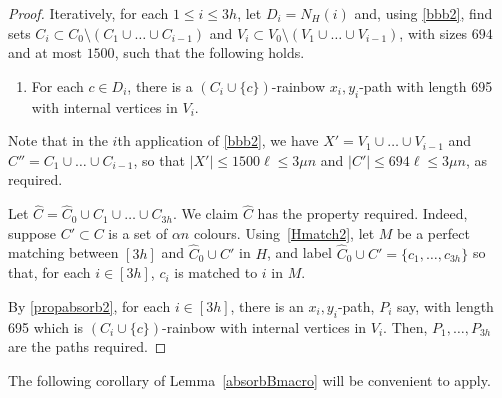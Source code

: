 \begin{proof}
Iteratively, for each $1\leq i\leq 3h$, let $D_i=N_H(i)$ and, using \ref{bbb2}, find sets $C_i\subset C_0\setminus (C_1\cup\ldots\cup C_{i-1})$ and $V_i\subset V_0\setminus (V_1\cup \ldots\cup V_{i-1})$,
with sizes $694$ and at most $1500$, such that the following holds.

\begin{enumerate}[label = {\bfseries \Alph{propcounter}\arabic{enumi}}]\addtocounter{enumi}{2}
\item For each $c\in D_i$, there is a $(C_i\cup\{c\})$-rainbow $x_i,y_i$-path with length 695 with internal vertices in $V_i$.\label{propabsorb2}
\end{enumerate}

Note that in the $i$th application of \ref{bbb2}, we have $X'=V_1\cup \ldots\cup V_{i-1}$ and $C''=C_1\cup\ldots \cup C_{i-1}$, so that $|X'|\leq 1500\ell\leq 3\mu n$ and $|C'|\leq 694\ell\leq 3\mu n$, as required.

Let $\hat{C}=\hat C_0\cup C_1\cup \ldots\cup C_{3h}$. We claim $\hat{C}$ has the property required. Indeed, suppose $C'\subset C$ is a set of $\alpha n$
colours. Using~\ref{Hmatch2}, let $M$ be a perfect matching between $[3h]$ and $\hat{C}_0\cup C'$ in $H$, and label $\hat C_0\cup C'=\{c_1,\ldots,c_{3h}\}$ so that, for each $i\in [3h]$, $c_i$ is matched to $i$ in $M$.

By \ref{propabsorb2}, for each $i\in [3h]$, there is an $x_i,y_i$-path, $P_i$ say, with length 695 which is $(C_i\cup\{c\})$-rainbow with internal vertices in $V_i$. Then, $P_1,\ldots, P_{3h}$ are the paths required.
\end{proof}

The following corollary of Lemma~\ref{absorbBmacro} will be convenient to apply.


